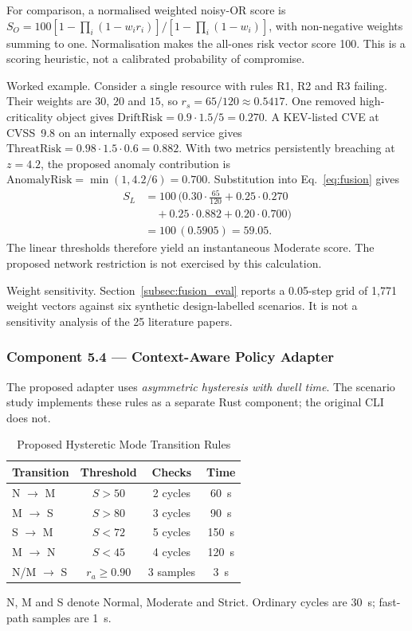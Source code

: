 \documentclass{ieeeaccess}
\renewcommand{\textbf}[1]{#1}
\begin{document}
For comparison, a normalised weighted noisy-OR score is $S_O=100[1-\prod_i(1-w_i r_i)]/[1-\prod_i(1-w_i)]$, with non-negative weights summing to one. Normalisation makes the all-ones risk vector score 100. This is a scoring heuristic, not a calibrated probability of compromise.

\noindent\textbf{Worked example.} Consider a single resource with rules R1, R2 and R3 failing. Their weights are $30$, $20$ and $15$, so $r_s=65/120\approx0.5417$. One removed high-criticality object gives $\text{DriftRisk}=0.9\cdot1.5/5=0.270$. A KEV-listed CVE at CVSS~9.8 on an internally exposed service gives $\text{ThreatRisk}=0.98\cdot1.5\cdot0.6=0.882$. With two metrics persistently breaching at $z=4.2$, the proposed anomaly contribution is $\text{AnomalyRisk}=\min(1,4.2/6)=0.700$. Substitution into Eq.~\ref{eq:fusion} gives
\begin{align}
S_L &= 100\,(0.30\cdot\tfrac{65}{120}+0.25\cdot0.270 \nonumber\\
&\quad +0.25\cdot0.882+0.20\cdot0.700) \nonumber\\
&=100\,(0.5905)=59.05.
\end{align}
The linear thresholds therefore yield an instantaneous Moderate score. The proposed network restriction is not exercised by this calculation.

\noindent\textbf{Weight sensitivity.} Section~\ref{subsec:fusion_eval} reports a 0.05-step grid of 1,771 weight vectors against six synthetic design-labelled scenarios. It is not a sensitivity analysis of the 25 literature papers.

\subsubsection{Component 5.4 --- Context-Aware Policy Adapter}
\label{subsubsec:adapter}

The proposed adapter uses \emph{asymmetric hysteresis with dwell time}. The scenario study implements these rules as a separate Rust component; the original CLI does not.

\begin{table}[ht]
\caption{Proposed Hysteretic Mode Transition Rules}
\label{tab:hysteresis}
\centering
\footnotesize
\setlength{\tabcolsep}{4pt}
\begin{tabular}{@{}lccc@{}}
\toprule
\textbf{Transition} & \textbf{Threshold} & \textbf{Checks} & \textbf{Time} \\
\midrule
N $\rightarrow$ M & $S > 50$ & 2 cycles & 60~s \\
M $\rightarrow$ S & $S > 80$ & 3 cycles & 90~s \\
S $\rightarrow$ M & $S < 72$ & 5 cycles & 150~s \\
M $\rightarrow$ N & $S < 45$ & 4 cycles & 120~s \\
N/M $\rightarrow$ S & $r_a\geq0.90$ & 3 samples & 3~s \\
\bottomrule
\end{tabular}
\par\smallskip
\parbox{\columnwidth}{\scriptsize N, M and S denote Normal, Moderate and Strict. Ordinary cycles are 30~s; fast-path samples are 1~s.}
\end{table}
\end{document}
